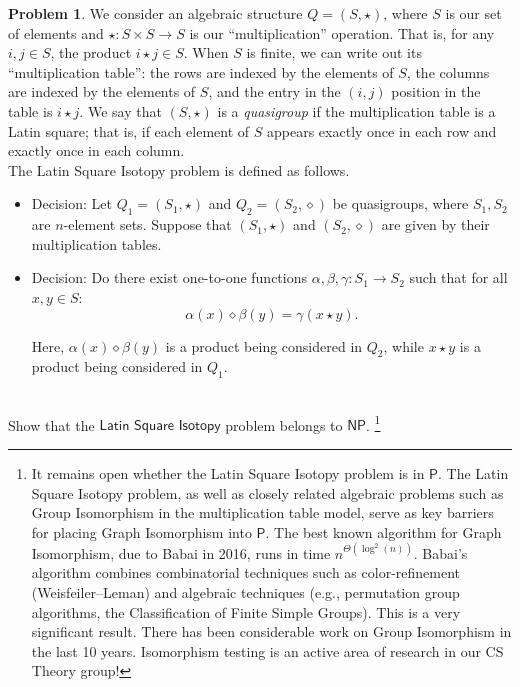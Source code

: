 \documentclass[11pt]{article}
\theoremstyle{definition}
\theoremstyle{definition}
\newtheorem{required}{Problem}
\theoremstyle{definition}
\begin{document}
\begin{required}
We consider an algebraic structure $Q = (S, \star)$, where $S$ is our set of elements and $\star : S \times S \to S$ is our ``multiplication'' operation. That is, for any $i, j \in S$, the product $i \star j \in S$. When $S$ is finite, we can write out its ``multiplication table'': the rows are indexed by the elements of $S$, the columns are indexed by the elements of $S$, and the entry in the $(i,j)$ position in the table is $i \star j$. We say that $(S, \star)$ is a \textit{quasigroup} if the multiplication table is a Latin square; that is, if each element of $S$ appears exactly once in each row and exactly once in each column. \\

\noindent The \textsf{Latin Square Isotopy} problem is defined as follows.
\begin{itemize}
\item \textsf{Decision:} Let $Q_{1} = (S_{1}, \star)$ and $Q_{2} = (S_{2}, \diamond)$ be quasigroups, where $S_{1}, S_{2}$ are $n$-element sets. Suppose that $(S_{1}, \star)$ and $(S_{2}, \diamond)$ are given by their multiplication tables.

\item \textsf{Decision:} Do there exist one-to-one functions $\alpha, \beta, \gamma : S_{1} \to S_{2}$ such that for all $x, y \in S$: 
\[
\alpha(x) \diamond \beta(y) = \gamma(x \star y).
\]

Here, $\alpha(x) \diamond \beta(y)$ is a product being considered in $Q_{2}$, while $x \star y$ is a product being considered in $Q_{1}$.
\end{itemize}

\noindent \\ Show that the $\textsf{Latin Square Isotopy}$ problem belongs to $\textsf{NP}$. \footnote{It remains open whether the \textsf{Latin Square Isotopy} problem is in $\textsf{P}$. The \textsf{Latin Square Isotopy} problem, as well as closely related algebraic problems such as \textsf{Group Isomorphism} in the multiplication table model, serve as key barriers for placing \textsf{Graph Isomorphism} into $\textsf{P}$. The best known algorithm for \textsf{Graph Isomorphism}, due to Babai in 2016, runs in time $n^{\Theta(\log^{2}(n))}$. Babai's algorithm combines combinatorial techniques such as color-refinement (Weisfeiler--Leman) and algebraic techniques (e.g., permutation group algorithms, the Classification of Finite Simple Groups). This is a very significant result. There has been considerable work on \textsf{Group Isomorphism} in the last 10 years. Isomorphism testing is an active area of research in our CS Theory group!}
\end{required}
\end{document}
